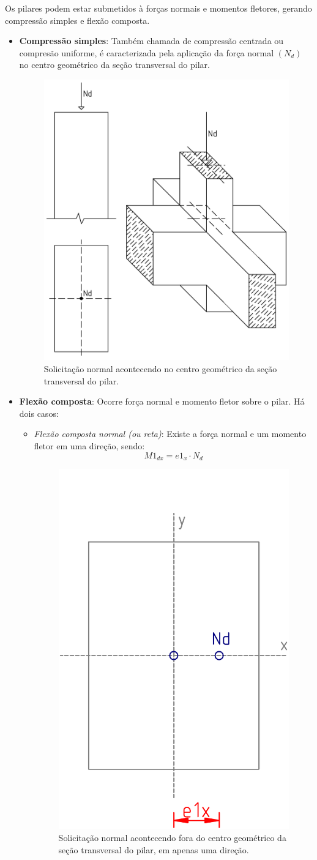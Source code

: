 Os pilares podem estar submetidos à forças normais e momentos fletores, gerando compressão simples e flexão composta.

\begin{itemize}

	\item \textbf{Compressão simples}: Também chamada de compressão centrada ou compresão uniforme, é caracterizada pela aplicação da força normal $(N_d)$ no centro geométrico da seção transversal do pilar.

		\begin{figure}[H]
			\begin{center}
				\caption{Solicitação normal acontecendo no centro geométrico da seção transversal do pilar.}    	
				\includegraphics[height=0.5\textwidth]{Solicitacoes-normais/Imagens/Compressao-simples.png}
			\end{center}
		\end{figure}

	\item \textbf{Flexão composta}: Ocorre força normal e momento fletor sobre o pilar. Há dois casos:

		\begin{itemize}
     			\item \textit{Flexão composta normal (ou reta)}: Existe a força normal e um momento fletor em uma direção, sendo:
				\begin{equation}M1_{dx}=e1_x\cdot N_d\end{equation}

				\begin{figure}[H]
					\begin{center}
						\caption{Solicitação normal acontecendo fora do centro geométrico da seção transversal do pilar, em apenas uma direção.}    	
						\includegraphics[height=0.4\textwidth]{Solicitacoes-normais/Imagens/Flexao-composta-normal.png}
					\end{center}
				\end{figure}
				

\end{itemize}
\end{itemize}
